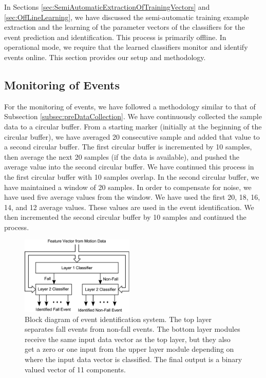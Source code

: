 \documentclass[]{IEEEtran}
\begin{document}
In Sections \ref{sec:SemiAutomaticExtractionOfTrainingVectors} and 
\ref{sec:OffLineLearning}, we have discussed the semi-automatic training example 
extraction and the learning of the parameter vectors of the classifiers for the event 
prediction and identification. This process is primarily offline. In operational mode, we 
require that the learned classifiers monitor and identify events online. This section 
provides our setup and methodology.  



\subsection{Monitoring of Events}

For the monitoring of events, we have followed a methodology similar to that of 
Subsection \ref{subsec:preDataCollection}. We have continuously collected the sample data 
to a circular buffer. From a starting marker (initially at the beginning of the circular buffer), 
we have averaged 20 consecutive sample and added that value to a second circular buffer. The 
first circular buffer is incremented by 10 samples, then average the next 20 samples (if the 
data 
is available), and pushed  the average value into the second circular buffer. We have 
continued this process in 
the first circular buffer with 10 samples overlap. In the second circular buffer, we have 
maintained a window of 20 samples. 
In order to compensate for noise, we have used five average values from the window. We 
have 
used the first 20, 18, 16, 14, and 12 average values. These  values are used in the event 
identification. We then incremented the second circular buffer by 10 samples and continued 
the process.  

\begin{figure}[h]
	\centering
		\includegraphics[width=0.48\textwidth]{figures/TrainedIdentificationModule.eps}
	\caption{Block diagram of event identification system. The top layer separates fall events from non-fall events. The bottom layer modules receive the same input data vector as the top layer, but they also get a zero or one input from the upper layer module depending on where the input data vector is classified. The final output is a binary valued vector of 11 components.}
	\label{fig:TrainedIdentificationModule}
\end{figure}
\end{document}

